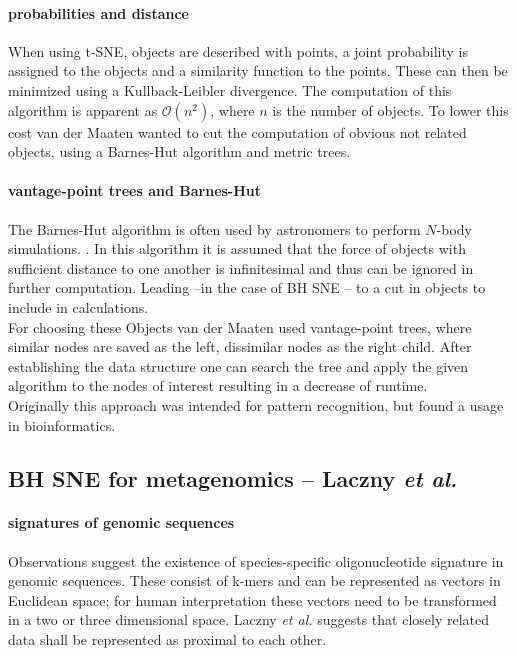 \documentclass[twocolumn]{bmcart}%
\begin{document}
\paragraph*{probabilities and distance}
When using t-SNE, objects are described with points, a joint probability is assigned to the objects and a similarity function to the points. These can then be minimized using a Kullback-Leibler divergence. \cite{DBLP:journals/corr/abs-1301-3342} The computation of this algorithm is apparent as $\mathcal{O}(n^2)$, where $n$ is the number of objects. To lower this cost van der Maaten wanted to cut the computation of obvious not related objects, using a Barnes-Hut algorithm and metric trees.
\paragraph*{vantage-point trees and Barnes-Hut }
 The Barnes-Hut algorithm is often used by astronomers to perform $N$-body simulations.\cite{DBLP:journals/corr/abs-1301-3342} . In this algorithm it is assumed that the force of objects with sufficient distance to one another is infinitesimal and thus can be ignored in further computation. Leading --in the case of BH SNE -- to a cut in objects to include in calculations.\\
 For choosing these Objects van der Maaten used vantage-point trees, where similar nodes are saved as the left, dissimilar nodes as the right child. After establishing the data structure one can search the tree and apply the given algorithm to the nodes of interest resulting in a decrease of runtime.\\
 Originally this approach was intended for pattern recognition, but found a usage in bioinformatics.
\subsection*{BH SNE for metagenomics -- Laczny \textit{et al.}}
\paragraph*{signatures of genomic sequences}
Observations suggest the existence of species-specific oligonucleotide signature in genomic sequences. \cite{Cheng1194}\cite{Laczny2014} These consist of k-mers and can be represented as vectors in Euclidean space; for human interpretation these vectors need to be transformed in a two or three dimensional space.\cite{Laczny2014} Laczny \textit{et al.} suggests that closely related data shall be represented as proximal to each other.
\end{document}
